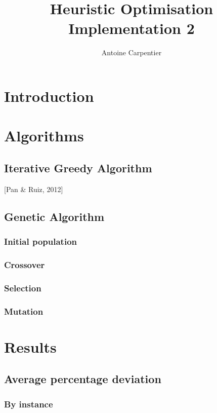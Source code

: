 \documentclass[a4paper,10pt]{article}
\title{Heuristic Optimisation\\Implementation 2}
\author{Antoine Carpentier}
\begin{document}
\maketitle

\section{Introduction}

\section{Algorithms}

\subsection{Iterative Greedy Algorithm}

[Pan \& Ruiz, 2012]

\subsection{Genetic Algorithm}

\subsubsection{Initial population}

\subsubsection{Crossover}

\subsubsection{Selection}

\subsubsection{Mutation}

\section{Results}

\subsection{Average percentage deviation}

\subsubsection{By instance}
\end{document}

